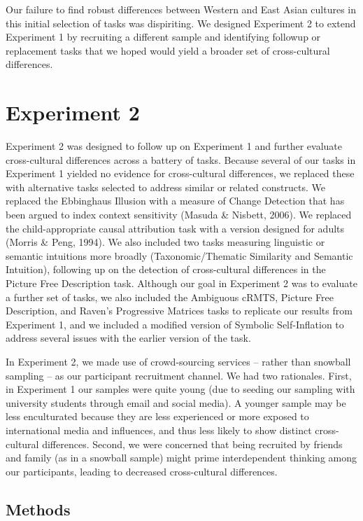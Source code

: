 \documentclass[
  man,floatsintext]{apa6}
\begin{document}
Our failure to find robust differences between Western and East Asian cultures in this initial selection of tasks was dispiriting. We designed Experiment 2 to extend Experiment 1 by recruiting a different sample and identifying followup or replacement tasks that we hoped would yield a broader set of cross-cultural differences.

\hypertarget{experiment-2}{%
\section{Experiment 2}\label{experiment-2}}

Experiment 2 was designed to follow up on Experiment 1 and further evaluate cross-cultural differences across a battery of tasks. Because several of our tasks in Experiment 1 yielded no evidence for cross-cultural differences, we replaced these with alternative tasks selected to address similar or related constructs. We replaced the Ebbinghaus Illusion with a measure of Change Detection that has been argued to index context sensitivity (Masuda \& Nisbett, 2006). We replaced the child-appropriate causal attribution task with a version designed for adults (Morris \& Peng, 1994). We also included two tasks measuring linguistic or semantic intuitions more broadly (Taxonomic/Thematic Similarity and Semantic Intuition), following up on the detection of cross-cultural differences in the Picture Free Description task. Although our goal in Experiment 2 was to evaluate a further set of tasks, we also included the Ambiguous cRMTS, Picture Free Description, and Raven's Progressive Matrices tasks to replicate our results from Experiment 1, and we included a modified version of Symbolic Self-Inflation to address several issues with the earlier version of the task.

In Experiment 2, we made use of crowd-sourcing services -- rather than snowball sampling -- as our participant recruitment channel. We had two rationales. First, in Experiment 1 our samples were quite young (due to seeding our sampling with university students through email and social media). A younger sample may be less enculturated because they are less experienced or more exposed to international media and influences, and thus less likely to show distinct cross-cultural differences. Second, we were concerned that being recruited by friends and family (as in a snowball sample) might prime interdependent thinking among our participants, leading to decreased cross-cultural differences.

\hypertarget{methods-1}{%
\subsection{Methods}\label{methods-1}}
\end{document}
